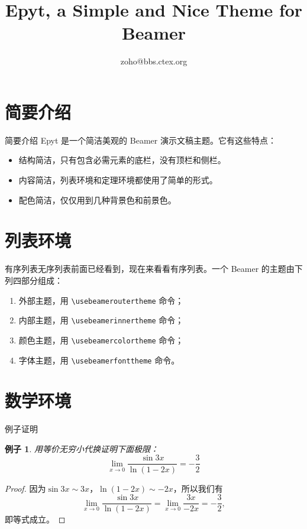 \documentclass[14pt,notheorems]{beamer}
\title{Epyt, a Simple and Nice Theme for Beamer}
\author{zoho@bbs.ctex.org}
\newtheorem{example}[theorem]{例子}
\begin{document}
\begin{frame}[plain]\transboxout
\titlepage
\end{frame}

\begin{frame}\transboxin
\begin{center}
\tableofcontents[hideallsubsections]
\end{center}
\end{frame}

\section{简要介绍}

\begin{frame}{简要介绍}\transdissolve
Epyt 是一个简洁美观的 Beamer 演示文稿主题。它有这些特点：\pause
\begin{itemize}[<+->]
\item 结构简洁，只有包含必需元素的底栏，没有顶栏和侧栏。
\item 内容简洁，列表环境和定理环境都使用了简单的形式。
\item 配色简洁，仅仅用到几种背景色和前景色。
\end{itemize}
\end{frame}

\section{列表环境}

\begin{frame}[fragile]{有序列表}\transwipe[direction=270]
无序列表前面已经看到，现在来看看有序列表。一个 Beamer 的主题由下列四部分组成：\pause
\begin{enumerate}[<+->]
\item 外部主题，用 \verb!\usebeameroutertheme! 命令；
\item 内部主题，用 \verb!\usebeamerinnertheme! 命令；
\item 颜色主题，用 \verb!\usebeamercolortheme! 命令；
\item 字体主题，用 \verb!\usebeamerfonttheme! 命令。
\end{enumerate}
\end{frame}

\section{数学环境}

\begin{frame}{例子证明}\transglitter[direction=90]
\begin{example}
用等价无穷小代换证明下面极限：
\[ \lim_{x\to0}\frac{\sin 3x}{\ln(1-2x)}=-\frac{3}{2} \]
\end{example}\pause
\begin{proof}
因为$\sin 3x \sim 3x$，$\ln(1-2x) \sim -2x$，所以我们有
\[ \lim_{x\to0}\frac{\sin 3x}{\ln(1-2x)}=\lim_{x\to0}\frac{3x}{-2x}=-\frac{3}{2}, \]
即等式成立。
\end{proof}
\end{frame}
\end{document}
